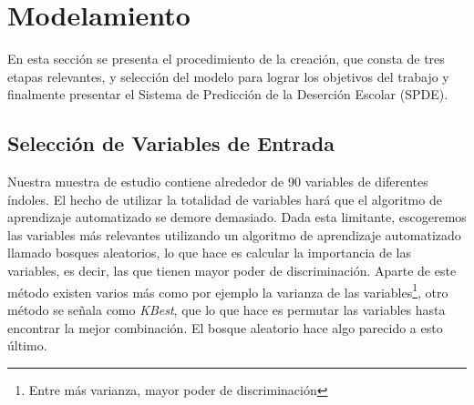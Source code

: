 \section{Modelamiento}
En esta sección se presenta el procedimiento de la creación, que consta de tres etapas relevantes, y selección del modelo para lograr los objetivos del trabajo y finalmente presentar el Sistema de Predicción de la Deserción Escolar (SPDE).

\subsection{Selección de Variables de Entrada}
Nuestra muestra de estudio contiene alrededor de 90 variables de diferentes índoles. El hecho de utilizar la totalidad de variables hará que el algoritmo de aprendizaje automatizado se demore demasiado. Dada esta limitante, escogeremos las variables más relevantes utilizando un algoritmo de aprendizaje automatizado llamado bosques aleatorios, lo que hace es calcular la importancia de las variables, es decir, las que tienen mayor poder de discriminación. Aparte de este método existen varios más como por ejemplo la varianza de las variables\footnote{Entre más varianza, mayor poder de discriminación}, otro método se señala como \textit{KBest}, que lo que hace es permutar las variables hasta encontrar la mejor combinación. El bosque aleatorio hace algo parecido a esto último.

